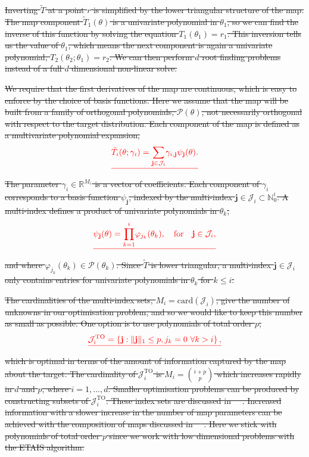 \documentclass[final]{siamltex}
\providecommand{\DIFdel}[1]{{\protect\color{red}\sout{#1}}}                      %
\providecommand{\DIFdelbegin}{} %
\newcommand{\DIFscaledelfig}{0.5}
\newlength{\DIFdelgraphicswidth} %
\newlength{\DIFdelgraphicsheight} %
\newcommand{\DIFdelincludegraphics}[2][]{%
\sbox{\DIFdelgraphicsbox}{\DIFOincludegraphics[#1]{#2}}%
\settoboxwidth{\DIFdelgraphicswidth}{\DIFdelgraphicsbox} %
\settoboxtotalheight{\DIFdelgraphicsheight}{\DIFdelgraphicsbox} %
\scalebox{\DIFscaledelfig}{%
\parbox[b]{\DIFdelgraphicswidth}{\usebox{\DIFdelgraphicsbox}\\[-\baselineskip] \rule{\DIFdelgraphicswidth}{0em}}\llap{\resizebox{\DIFdelgraphicswidth}{\DIFdelgraphicsheight}{%
\setlength{\unitlength}{\DIFdelgraphicswidth}%
\begin{picture}(1,1)%
\thicklines\linethickness{2pt} %
{\color[rgb]{1,0,0}\put(0,0){\framebox(1,1){}}}%
{\color[rgb]{1,0,0}\put(0,0){\line( 1,1){1}}}%
{\color[rgb]{1,0,0}\put(0,1){\line(1,-1){1}}}%
\end{picture}%
}\hspace*{3pt}}} %
} %
\DeclareRobustCommand{\DIFdelbegin}{\DIFOdelbegin \let\includegraphics\DIFdelincludegraphics} %
\begin{document}
\DIFdelbegin \DIFdel{Inverting $\tilde{T}$ at a point $r$ is simplified by the lower triangular structure of the map. The map component $\tilde{T}_1(\theta)$ is a univariate polynomial in $\theta_1$, so we can find the inverse of this function by solving the equation $T_1(\theta_1) = r_1$. This inversion tells us the value of $\theta_1$, which means the next component is again a univariate polynomial, $T_2(\theta_2; \theta_1)=r_2$. We can then perform $d$ root finding problems instead of a full $d$ dimensional non-linear solve.
}%

\DIFdel{We require that the first derivatives of the map are continuous, which is easy to enforce by the choice of basis functions. Here we assume that the map will be built from a family of orthogonal polynomials, $\mathcal{P}(\theta)$, not necessarily orthogonal with respect to the target distribution. Each component of the map is defined as a multivariate polynomial expansion,
}\begin{displaymath}\DIFdel{
	\tilde{T}_i(\theta; \gamma_i) = \sum\limits_{\mathbf{j}\in\mathcal{J}_i} \!
\gamma_{i,\mathbf{j}}\psi_\mathbf{j}(\theta).
}\end{displaymath}
\DIFdel{The parameter $\gamma_i \in \mathbb{R}^{M_i}$ is a vector of coefficients. Each component of $\gamma_i$ corresponds to a basis function
$\psi_\mathbf{j}$, indexed by the multi-index $\mathbf{j} \in
\mathcal{J}_i \subset \mathbb{N}_0^i$. A multi-index defines a product of univariate polynomials in $\theta_k$,
}\[
	\DIFdel{\psi_\mathbf{j}(\theta) = \prod\limits_{k=1}^i \! \varphi_{j_k}(\theta_k), \quad \text{for} \quad \mathbf{j} \in \mathcal{J}_i,
}\]
\DIFdel{and where $\varphi_{j_k}(\theta_k) \in \mathcal{P}(\theta_k)$. Since $\tilde{T}$ is lower triangular, a multi-index $\mathbf{j}\in\mathcal{J}_i$ only contains entries for univariate polynomials in $\theta_k$ for $k\leq i$.
}%

\DIFdel{The cardinalities of the multi-index sets, $M_i = \text{card}(\mathcal{J}_i)$, give the number of unknowns in our
optimisation problem, and so we would like to keep this number as small as possible. One option is
to use polynomials of total order $p$,
}\[
	\DIFdel{\mathcal{J}_i^\text{TO} = \left\{\mathbf{j}:\|\mathbf{j}\|_1 \leq p, j_k = 0\ \forall k > i\right\},
}\]
\DIFdel{which is optimal in terms of the amount of information captured by the map about the target. The cardinality of $\mathcal{J}_i^\text{TO}$ is $M_i = \binom{i+p}{p}$ which increases rapidly in $d$ and $p$, where $i = 1, \dots, d$. Smaller optimisation problems can be produced by constructing subsets of $\mathcal{J}_i^\text{TO}$. These index sets are discussed
in~\mbox{%
\cite{parno2014transport}}\hspace{0pt}%
. Increased information with a slower increase in the number of map parameters can be achieved with the composition of maps discussed in~\mbox{%
\cite{parno2015transport}}\hspace{0pt}%
. Here we stick with polynomials of total order $p$ since we work with low dimensional problems with the ETAIS algorithm.
}%
\end{document}
